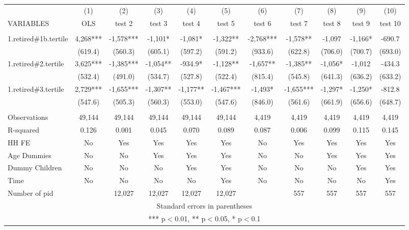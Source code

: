 \begin{tabular}{lcccccccccc} \hline
 & (1) & (2) & (3) & (4) & (5) & (6) & (7) & (8) & (9) & (10) \\
VARIABLES & OLS & test 2 & test 3 & test 4 & test 5 & test 6 & test 7 & test 8 & test 9 & test 10 \\ \hline
 &  &  &  &  &  &  &  &  &  &  \\
1.retired\#1b.tertile & 4,268*** & -1,578*** & -1,101* & -1,081* & -1,322** & -2,768*** & -1,578** & -1,097 & -1,166* & -690.7 \\
 & (619.4) & (560.3) & (605.1) & (597.2) & (591.2) & (933.6) & (622.8) & (706.0) & (700.7) & (693.0) \\
1.retired\#2.tertile & 3,625*** & -1,385*** & -1,054** & -934.9* & -1,128** & -1,657** & -1,385** & -1,056* & -1,012 & -434.3 \\
 & (532.4) & (491.0) & (534.7) & (527.8) & (522.4) & (815.4) & (545.8) & (641.3) & (636.2) & (633.2) \\
1.retired\#3.tertile & 2,729*** & -1,655*** & -1,307** & -1,177** & -1,467*** & -1,493* & -1,655*** & -1,297* & -1,250* & -812.8 \\
 & (547.6) & (505.3) & (560.3) & (553.0) & (547.6) & (846.0) & (561.6) & (661.9) & (656.6) & (648.7) \\
 &  &  &  &  &  &  &  &  &  &  \\
Observations & 49,144 & 49,144 & 49,144 & 49,144 & 49,144 & 4,419 & 4,419 & 4,419 & 4,419 & 4,419 \\
R-squared & 0.126 & 0.001 & 0.045 & 0.070 & 0.089 & 0.087 & 0.006 & 0.099 & 0.115 & 0.145 \\
HH FE & No & Yes & Yes & Yes & Yes & No & Yes & Yes & Yes & Yes \\
Age Dummies & No & No & Yes & Yes & Yes & No & No & Yes & Yes & Yes \\
Dummy Children & No & No & No & Yes & Yes & No & No & No & Yes & Yes \\
Time & No & No & No & No & Yes & No & No & No & No & Yes \\
 Number of pid &  & 12,027 & 12,027 & 12,027 & 12,027 &  & 557 & 557 & 557 & 557 \\ \hline
\multicolumn{11}{c}{ Standard errors in parentheses} \\
\multicolumn{11}{c}{ *** p$<$0.01, ** p$<$0.05, * p$<$0.1} \\
\end{tabular}
